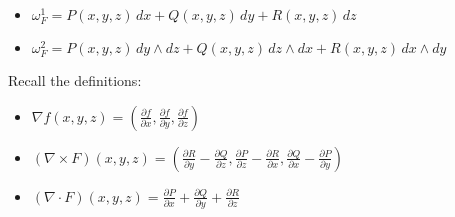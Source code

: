 \documentclass[11pt]{article}
\begin{document}
\begin{itemize}
    \item \(\omega^1_F = P(x, y, z)\,dx + Q(x, y, z)\,dy + R(x, y, z)\,dz\)
    \item \(\omega^2_F = P(x, y, z)\,dy \wedge dz + Q(x, y, z)\,dz \wedge dx + R(x, y, z)\,dx \wedge dy\)
\end{itemize}

Recall the definitions:
\begin{itemize}
    \item \(\nabla f(x, y, z) = \left( \frac{\partial f}{\partial x}, \frac{\partial f}{\partial y}, \frac{\partial f}{\partial z} \right)\)
    \item \((\nabla \times F)(x, y, z) = \left( \frac{\partial R}{\partial y} - \frac{\partial Q}{\partial z}, \frac{\partial P}{\partial z} - \frac{\partial R}{\partial x}, \frac{\partial Q}{\partial x} - \frac{\partial P}{\partial y} \right)\)
    \item \((\nabla \cdot F)(x, y, z) = \frac{\partial P}{\partial x} + \frac{\partial Q}{\partial y} + \frac{\partial R}{\partial z}\)
\end{itemize}
\end{document}
